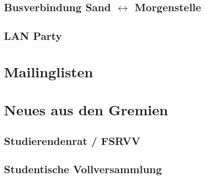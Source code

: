 \documentclass{fsinewsletter}
\begin{document}
\subsection{Busverbindung Sand $\leftrightarrow$ Morgenstelle}


\subsection{LAN Party}


\vfill
\newpage

\section{Mailinglisten}


\section{Neues aus den Gremien}


\subsection{Studierendenrat / FSRVV}


\subsection{Studentische Vollversammlung}



\vfill
\newpage
\end{document}
